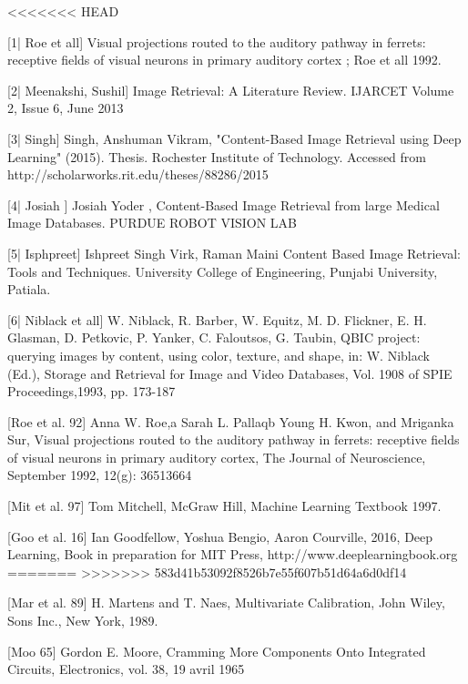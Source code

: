<<<<<<< HEAD







[1| Roe et all] Visual projections routed to the auditory pathway in ferrets: receptive fields of visual neurons in primary auditory cortex ; Roe et all 1992. 

[2| Meenakshi, Sushil] Image Retrieval: A Literature Review. IJARCET Volume 2, Issue 6, June 2013

[3| Singh] Singh, Anshuman Vikram, "Content-Based Image Retrieval using Deep Learning" (2015). Thesis. Rochester Institute of Technology.  Accessed from http://scholarworks.rit.edu/theses/88286/2015

[4| Josiah ] Josiah Yoder , Content-Based Image Retrieval from large Medical Image Databases. PURDUE ROBOT VISION LAB 

[5| Isphpreet] Ishpreet Singh Virk, Raman Maini Content Based Image Retrieval: Tools and Techniques.  University College of Engineering, Punjabi University, Patiala.

[6| Niblack et all] W. Niblack, R. Barber, W. Equitz, M. D. Flickner, E. H. Glasman, D. Petkovic, P. Yanker, C. Faloutsos, G. Taubin, QBIC project: querying images by content, using color, texture, and shape, in: W. Niblack (Ed.), Storage and Retrieval for Image and Video Databases, Vol. 1908 of SPIE Proceedings,1993, pp. 173-187








[Roe et al. 92] Anna W. Roe,a Sarah L. Pallaqb Young H. Kwon, and Mriganka Sur, Visual projections routed to the auditory pathway in ferrets: receptive fields of visual neurons in primary auditory cortex, The Journal of Neuroscience, September 1992, 12(g): 36513664

[Mit et al. 97] Tom Mitchell, McGraw Hill, Machine Learning Textbook 1997.

[Goo et al. 16] Ian Goodfellow, Yoshua Bengio, Aaron Courville, 2016, Deep Learning, Book in preparation for MIT Press, http://www.deeplearningbook.org
=======
>>>>>>> 583d41b53092f8526b7e55f607b51d64a6d0df14

[Mar et al. 89] H. Martens and T. Naes, Multivariate Calibration, John Wiley, Sons Inc., New York, 1989.

[Moo 65] Gordon E. Moore, Cramming More Components Onto Integrated Circuits, Electronics, vol. 38,‎ 19 avril 1965

